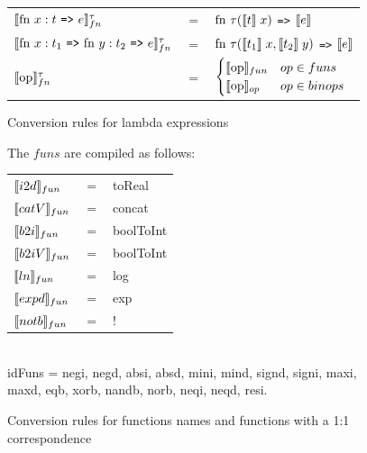 \documentclass[11pt]{article}
\begin{document}
\begin{figure}
\begin{tabular}{l c l}
$\evals{ \text{fn } x:t $ {\tt =>} $ e}^{\tau}_{fn} $ & $=$ & $ \text{fn } \tau (\llbracket t \rrbracket\; x) $ {\tt =>} $ \llbracket e \rrbracket$\\
$\evals{ \text{fn } x:t_1$ {\tt =>} $\text{fn } y:t_2 $ {\tt =>} $ e}^{\tau}_{fn} $ & $=$ & $ \text{fn } \tau (\llbracket t_1 \rrbracket\; x, \llbracket t_2 \rrbracket \; y) $ {\tt =>} $ \llbracket e \rrbracket$\\
$\llbracket \text{op} \rrbracket^{\tau}_{fn}$ & = & $ \begin{cases} \llbracket \text{op} \rrbracket_{fun} & op \in funs \\ \llbracket \text{op} \rrbracket_{op} & op \in binops \end{cases}$
\end{tabular}
    \caption{Conversion rules for lambda expressions}
    \label{fig:lambdas}
\end{figure}

\begin{figure}
The $funs$ are compiled as follows:\\
\begin{tabular}{l c l}
$\llbracket i2d \rrbracket_{fun}$ & $=$ & toReal\\ 
$\llbracket catV \rrbracket_{fun}$ & $=$ & concat\\ 
$\llbracket b2i \rrbracket_{fun}$ & $=$ & boolToInt\\ 
$\llbracket b2iV \rrbracket_{fun}$ & $=$ & boolToInt\\ 
$\llbracket ln \rrbracket_{fun}$ & $=$ & log\\ 
$\llbracket expd \rrbracket_{fun}$ & $=$ & exp\\ 
$\llbracket notb \rrbracket_{fun}$ & $=$ & !\\ 
\end{tabular}\\


idFuns = negi, negd, absi, absd, mini, mind, signd, signi, maxi, maxd, eqb, xorb, nandb, norb, neqi, neqd, resi.
\caption{Conversion rules for functions names and functions with a 1:1 correspondence}
\label{fig:funs}
\end{figure}
\end{document}
